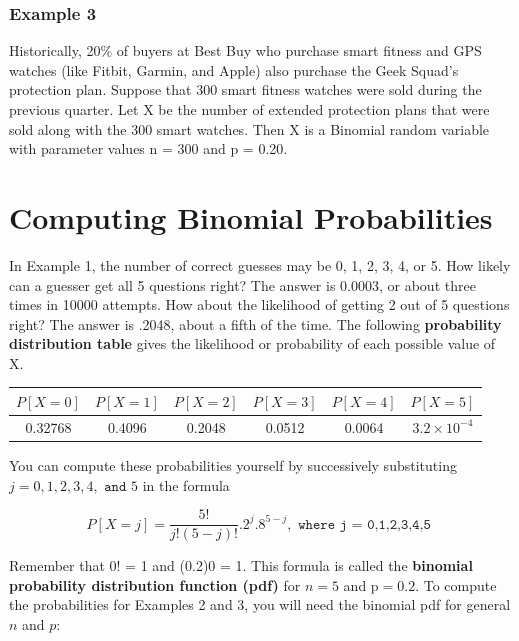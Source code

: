\documentclass[11pt, chapterprefix=true]{scrbook}\usepackage[]{graphicx}\usepackage[]{color}
\begin{document}
\subsubsection{Example 3} Historically, 20\% of buyers at Best Buy who purchase smart fitness and GPS watches (like Fitbit, Garmin, and Apple) also purchase the Geek Squad’s protection plan.  Suppose that 300 smart fitness watches were sold during the previous quarter.  Let X be the number of extended protection plans that were sold along with the 300 smart watches.  Then X is a Binomial random variable with parameter values n = 300 and p = 0.20.

\section{Computing Binomial Probabilities}

In Example 1, the number of correct guesses may be 0, 1, 2, 3, 4, or 5.  How likely can a guesser get all 5 questions right? The answer is 0.0003, or about three times in 10000 attempts.  How about the likelihood of getting 2 out of 5 questions right?  The answer is .2048, about a fifth of the time.  The following \textbf{probability distribution table} gives the likelihood or probability of each possible value of X.



\begin{center}
\begin{tabular}{@{} cccccc @{}} \hline
$P[X = 0]$ & $P[X = 1]$ & $P[X = 2]$ & $P[X = 3]$ & $P[X = 4]$ & $P[X = 5]$ \\ \hline
0.32768 & 0.4096 & 0.2048 & 0.0512 & 0.0064 & \ensuremath{3.2\times 10^{-4}} \\ \hline
\end{tabular}
\end{center}

You can compute these probabilities yourself by successively substituting \\ $j = 0, 1, 2, 3, 4, \texttt{ and } 5$ in the formula

\begin{equation*}
 P[ X = j] = \frac{5!}{j! (5 - j)!} .2^j .8^{5 - j}, \texttt{ where j = 0,1,2,3,4,5 }
 \end{equation*}

Remember that 0! = 1 and (0.2)0 = 1.  This formula is called the \textbf{binomial probability distribution function (pdf)} for $n = 5$ and p$ = 0.2$.  To compute the probabilities for Examples 2 and 3, you will need the binomial pdf for general $n$ and $p$:
\end{document}

